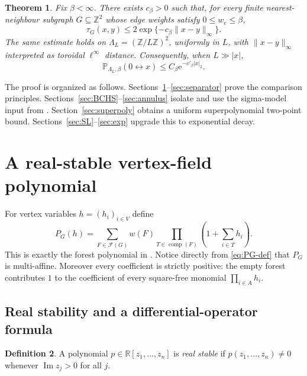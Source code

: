 \documentclass[11pt]{article}
\newtheorem{theorem}{Theorem}[section]
\theoremstyle{definition}
\newtheorem{definition}[theorem]{Definition}
\theoremstyle{remark}
\newcommand{\PP}{\mathbb P}
\newcommand{\ZZ}{\mathbb Z}
\newcommand{\cF}{\mathcal F}
\newcommand{\1}{\mathbf 1}
\newcommand{\e}{\mathrm e}
\begin{document}
\begin{theorem}\label{thm:main}
Fix $\beta<\infty$.  There exists $c_\beta>0$ such that, for every finite
nearest-neighbour subgraph $G\subseteq\ZZ^2$ whose edge weights satisfy
$0\le w_e\le\beta$,
\begin{equation}\label{eq:main-finite}
 \tau_G(x,y)\le 2\exp\{-c_\beta\|x-y\|_\infty\}.
\end{equation}
The same estimate holds on $\Lambda_L=(\ZZ/L\ZZ)^2$, uniformly in $L$, with
$\|x-y\|_\infty$ interpreted as toroidal $\ell^\infty$ distance.  Consequently, when
$L\gg |x|$,
\begin{equation}
 \PP_{\Lambda_L,\beta}(0\leftrightarrow x)\le C_\beta\e^{-c'_\beta |x|_2}.
\end{equation}
\end{theorem}

The proof is organized as follows.  Sections~\ref{sec:stability}--\ref{sec:separator}
prove the comparison principles.  Sections~\ref{sec:BCHS}--\ref{sec:annulus} isolate
and use the sigma-model input from \cite{BCHS}.  Section~\ref{sec:superpoly} obtains a uniform
superpolynomial two-point bound.  Sections~\ref{sec:SL}--\ref{sec:exp} upgrade this to
exponential decay.

\section{A real-stable vertex-field polynomial}\label{sec:stability}

For vertex variables $h=(h_i)_{i\in V}$ define
\begin{equation}\label{eq:PG-def}
 P_G(h)=\sum_{F\in\cF(G)}w(F)
 \prod_{T\in\operatorname{comp}(F)}\left(1+\sum_{i\in T}h_i\right).
\end{equation}
This is exactly the forest polynomial in
\cite[Theorem~2.1, (2.8)]{BCHS}.  Notice directly from \eqref{eq:PG-def} that
$P_G$ is multi-affine.  Moreover every coefficient is strictly positive: the empty
forest contributes $1$ to the coefficient of every square-free monomial
$\prod_{i\in A}h_i$.

\subsection{Real stability and a differential-operator formula}

\begin{definition}
A polynomial $p\in\mathbb R[z_1,\dots,z_n]$ is \emph{real stable} if
$p(z_1,\dots,z_n)\neq0$ whenever $\operatorname{Im}z_j>0$ for all $j$.
\end{definition}
\end{document}

